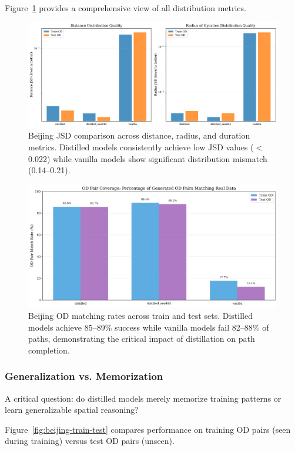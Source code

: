 Figure~\ref{fig:beijing-jsd-comparison} provides a comprehensive view of all distribution metrics.

\begin{figure}[t]
    \centering
    \includegraphics[width=0.8\linewidth]{assets/plots/eval/beijing/jsd_comparison.pdf}
    \caption{Beijing JSD comparison across distance, radius, and duration metrics. Distilled models consistently achieve low JSD values ($<$0.022) while vanilla models show significant distribution mismatch (0.14--0.21).}
    \label{fig:beijing-jsd-comparison}
\end{figure}

\begin{figure}[t]
    \centering
    \includegraphics[width=0.8\linewidth]{assets/plots/eval/beijing/od_matching_rates.pdf}
    \caption{Beijing OD matching rates across train and test sets. Distilled models achieve 85--89\% success while vanilla models fail 82--88\% of paths, demonstrating the critical impact of distillation on path completion.}
    \label{fig:beijing-od-rates}
\end{figure}

\subsubsection{Generalization vs. Memorization}

A critical question: do distilled models merely memorize training patterns or learn generalizable spatial reasoning?

Figure~\ref{fig:beijing-train-test} compares performance on training OD pairs (seen during training) versus test OD pairs (unseen).

